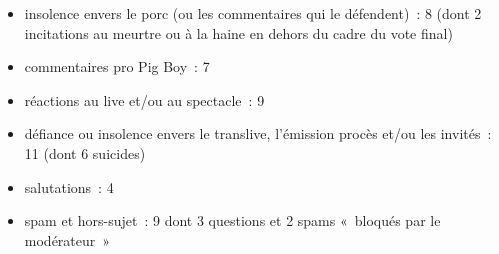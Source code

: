 \documentclass[
]{article}
\providecommand{\tightlist}{%
  \setlength{\itemsep}{0pt}\setlength{\parskip}{0pt}}
\begin{document}
\begin{itemize}
\tightlist
\item
  insolence envers le porc (ou les commentaires qui le défendent)~: 8 (dont 2 incitations au meurtre ou à la haine en dehors du cadre du vote final)
\item
  commentaires pro Pig Boy~: 7
\item
  réactions au live et/ou au spectacle~: 9
\item
  défiance ou insolence envers le translive, l'émission procès et/ou les invités~: 11 (dont 6 suicides)
\item
  salutations~: 4
\item
  spam et hors-sujet~: 9 dont 3 questions et 2 spams «~bloqués par le modérateur~»
\end{itemize}
\end{document}
